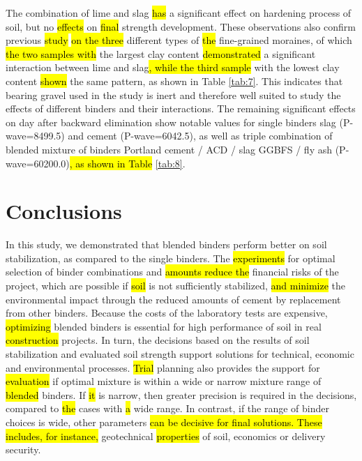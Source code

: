 \documentclass[materials,article,submit,pdftex,moreauthors]{Definitions/mdpi}
\begin{document}
The combination of lime and slag \hl{has} a significant effect on hardening process of soil, but no \hl{effects} on  \hl{final} strength development. These observations also confirm previous \hl{study} \cite{Lindh2001}\hl{ on the three} different types of \hl{the} fine-grained moraines, of which \hl{the two samples with} the largest clay content \hl{demonstrated} a significant interaction between lime and slag\hl{, while the third sample }with the lowest clay content \hl{shown} the same pattern, as\hl{ }shown in Table \ref{tab:7}. This indicates that\hl{ }bearing gravel used in the study is inert and therefore well suited to\hl{ }study the effects of different binders and their interactions. The remaining significant effects on day  after backward elimination\hl{ }show notable values for single binders slag (P-wave=8499.5) and cement (P-wave=6042.5), as well as\hl{ }triple combination of blended mixture of binders Portland cement / ACD / slag GGBFS / fly ash (P-wave=60200.0)\hl{, as shown in Table} \ref{tab:8}. 

\section{Conclusions}
In this study, we demonstrated that blended binders perform better on soil stabilization, as compared to the single binders. The \hl{experiments} for optimal selection of binder combinations and \hl{amounts reduce the} financial risks of the project, which are possible if \hl{soil} is not sufficiently stabilized, \hl{and minimize} the environmental impact through the reduced amounts of cement by replacement from other binders. Because the costs of the laboratory tests are expensive, \hl{optimizing} blended binders is essential for high performance of soil in real  \hl{construction} projects. In turn, the decisions based on the results of soil stabilization and evaluated soil strength support solutions for technical, economic and environmental processes. \hl{Trial} planning also provides the support for \hl{evaluation} if optimal mixture is within a wide or narrow mixture range of \hl{blended} binders. If \hl{it} is narrow, then greater precision is required in the decisions, compared to \hl{the} cases with \hl{a} wide range. In contrast, if the range of binder choices is wide, other parameters \hl{can be decisive for final solutions. These includes, for instance,} geotechnical \hl{properties} of soil, economics or delivery security.
\end{document}
